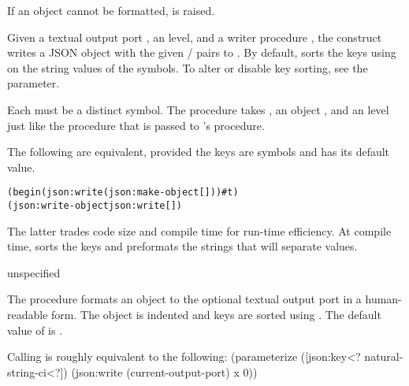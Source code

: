 If an object cannot be formatted, 
is raised.

\begin{syntax}
\end{syntax}
\returns{} 

Given a textual output port , an  level, and a
writer procedure , the  construct
writes a JSON object with the given  /  pairs to
. By default,  sorts the keys using
 on the string values of the symbols.
To alter or disable key sorting, see the  parameter.

Each  must be a distinct symbol.  The 
procedure takes , an object , and an  level
just like the  procedure that is passed to 's
 procedure.

The following are equivalent, provided the keys are symbols and  has its default value.

\antipar\begin{alltt}
(begin (json:write  (json:make-object [ ] \etc) ) \#t)
(json:write-object   json:write [ ] \etc)\end{alltt}\antipar

The latter trades code size and compile time for run-time efficiency.
At compile time,  sorts the keys and
preformats the strings that will separate values.

\begin{procedure}
\end{procedure}
\returns{} unspecified

The  procedure formats an object  to the
optional textual output port  in a human-readable form. The
object is indented and keys are sorted using
. The default value of  is
.

Calling  is roughly equivalent to the following:
\antipar\codebegin
(parameterize ([json:key<? natural-string-ci<?])
  (json:write (current-output-port) x 0))
\codeend

